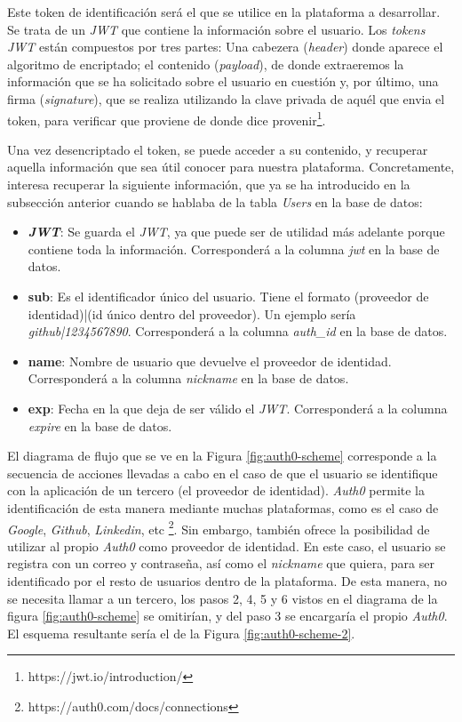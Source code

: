 \documentclass[11pt,spanish,listoffigures]{tfgetsinf}
\begin{document}
Este token de identificación será el que se utilice en la plataforma a desarrollar. Se trata de un \textit{JWT} que contiene la información sobre el usuario. Los \textit{tokens JWT} están compuestos por tres partes: Una cabezera (\textit{header}) donde aparece el algoritmo de encriptado; el contenido (\textit{payload}), de donde extraeremos la información que se ha solicitado sobre el usuario en cuestión y, por último, una firma (\textit{signature}), que se realiza utilizando la clave privada de aquél que envia el token, para verificar que proviene de donde dice provenir\footnote{https://jwt.io/introduction/}.

Una vez desencriptado el token, se puede acceder a su contenido, y recuperar aquella información que sea útil conocer para nuestra plataforma. Concretamente, interesa recuperar la siguiente información, que ya se ha introducido en la subsección anterior cuando se hablaba de la tabla \textit{Users} en la base de datos:

\begin{itemize}

\item \textbf{\textit{JWT}}: Se guarda el \textit{JWT}, ya que puede ser de utilidad más adelante porque contiene toda la información. Corresponderá a la columna \textit{jwt} en la base de datos.

\item \textbf{sub}: Es el identificador único del usuario. Tiene el formato (proveedor de identidad)|(id único dentro del proveedor). Un ejemplo sería \textit{github|1234567890}. Corresponderá a la columna \textit{auth\_id} en la base de datos.

\item \textbf{name}: Nombre de usuario que devuelve el proveedor de identidad. Corresponderá a la columna \textit{nickname} en la base de datos.

\item \textbf{exp}: Fecha en la que deja de ser válido el \textit{JWT}. Corresponderá a la columna \textit{expire} en la base de datos.

\end{itemize}

El diagrama de flujo que se ve en la Figura \ref{fig:auth0-scheme} corresponde a la secuencia de acciones llevadas a cabo en el caso de que el usuario se identifique con la aplicación de un tercero (el proveedor de identidad). \textit{Auth0} permite la identificación de esta manera mediante muchas plataformas, como es el caso de \textit{Google}, \textit{Github}, \textit{Linkedin}, etc \footnote{https://auth0.com/docs/connections}. Sin embargo, también ofrece la posibilidad de utilizar al propio \textit{Auth0} como proveedor de identidad. En este caso, el usuario se registra con un correo y contraseña, así como el \textit{nickname} que quiera, para ser identificado por el resto de usuarios dentro de la plataforma. De esta manera, no se necesita llamar a un tercero, los pasos 2, 4, 5 y 6 vistos en el diagrama de la figura \ref{fig:auth0-scheme} se omitirían, y del paso 3 se encargaría el propio \textit{Auth0}. El esquema resultante sería el de la Figura \ref{fig:auth0-scheme-2}.  
\end{document}
